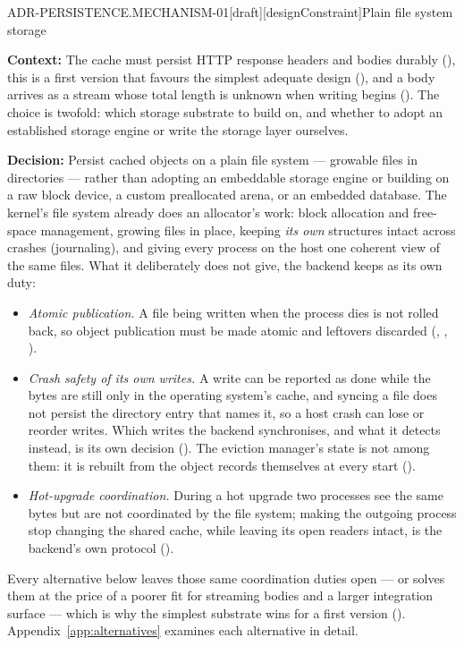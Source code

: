 \begin{requirement}{ADR-PERSISTENCE.MECHANISM-01}[draft][designConstraint]{Plain file system storage}


  \textbf{Context:} The cache must persist HTTP response headers and bodies
  durably (), this is a first version
  that favours the simplest adequate design (),
  and a body arrives as a stream whose total length is unknown when
  writing begins (). The choice is
  twofold: which storage substrate to build on, and whether to adopt an
  established storage engine or write the storage layer ourselves.

  \textbf{Decision:} Persist cached objects on a plain file system ---
  growable files in directories --- rather than adopting an embeddable
  storage engine or building on a raw block device, a custom preallocated
  arena, or an embedded database. The kernel's file system already does an
  allocator's work: block allocation and free-space management, growing
  files in place, keeping \emph{its own} structures intact across crashes
  (journaling), and giving every process on the host one coherent view of
  the same files. What it deliberately does not give, the backend keeps as
  its own duty:
  \begin{itemize}
    \item \emph{Atomic publication.} A file being written when the process
      dies is not rolled back, so object publication must be made atomic
      and leftovers discarded (,
      ,
      ).
    \item \emph{Crash safety of its own writes.} A write can be reported as
      done while the bytes are still only in the operating system's cache,
      and syncing a file does not persist the directory entry that names
      it, so a host crash can lose or reorder writes. Which writes the
      backend synchronises, and what it detects instead, is its own
      decision (). The eviction
      manager's state is not among them: it is rebuilt from the object
      records themselves at every start ().
    \item \emph{Hot-upgrade coordination.} During a hot upgrade two
      processes see the same bytes but are not coordinated by the file
      system; making the outgoing process stop changing the shared cache,
      while leaving its open readers intact, is the backend's own protocol
      ().
  \end{itemize}
  Every alternative below leaves those same coordination duties open ---
  or solves them at the price of a poorer fit for streaming bodies and a
  larger integration surface --- which is why the simplest substrate wins
  for a first version (). Appendix~\ref{app:alternatives}
  examines each alternative in detail.


\end{requirement}
